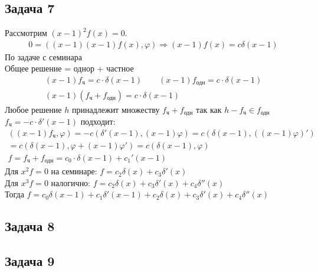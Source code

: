 \subsection*{Задача 7}
	Рассмотрим $(x-1)^2 f(x) = 0$.
	\begin{gather*}
		0 = ((x-1)(x-1)f(x), \varphi) \Rightarrow (x-1)f(x) = c \delta(x-1)
	\end{gather*}
	По задаче с семинара\\
	Общее решение = однор + частное
	\begin{gather*}
		(x-1)f_{\text{ч}} = c\cdot \delta(x-1)\qquad
		(x-1)f_{\text{одн}} = c \cdot \delta(x-1)\\
		(x-1)(f_{\text{ч}} + f_{\text{одн}}) = c \cdot \delta(x-1)
	\end{gather*}
	Любое решение $h$ принадлежит множеству $f_{\text{ч}} + f_{\text{одн}}$ так как $h - f_{\text{ч}} \in f_{\text{одн}}$\\
	$f_{\text{ч}} = -c \cdot \delta'(x-1)$ подходит:
	\begin{gather*}
		((x-1)f_{\text{ч}}, \varphi)
		= -c (\delta'(x-1), (x-1)\varphi)
		= c(\delta(x-1), ((x-1)\varphi)')\\
		= c(\delta(x-1), \varphi + (x-1) \varphi')
		= c(\delta(x-1), \varphi)\\
		f = f_{\text{ч}} + f_{\text{одн}} = c_{0} \cdot \delta(x-1) + c_{1}' (x-1)
	\end{gather*}
	Для $x^2 f = 0$ на семинаре: $f = c_{2} \delta(x) + c_{3} \delta'(x)$\\
	Для $x^3 f = 0$ налогично: $f = c_{2} \delta(x) + c_{3} \delta'(x) + c_{4} \delta''(x)$\\
	Тогда $f = c_{0} \delta(x-1) + c_{1} \delta'(x-1) + c_{2} \delta(x) + c_{3} \delta'(x) + c_{4} \delta''(x)$
\begin{comment}
	\begin{gather*}
		(f, x^2 \varphi) = (x^2f, \varphi) = 0\quad \forall \varphi \in \mathcal{D}(\mathbb{R})\\
		\{x^2 \varphi|\ \varphi \in \mathcal{D}\}
		= \{\varphi \in \mathcal{D}|\ \varphi(0) = \varphi'(0) = 0\}\\
		\varphi(0) = 0 \Rightarrow \psi = \frac{\varphi}{x} \in \mathcal{D}\\
		\psi(0) = \varphi'(0) = \frac{\varphi(x) - \varphi(0)}{x - 0}\\
		\varphi'(0) = 0\\
		\psi(0) = \varphi'(0) = 0 \Rightarrow \frac{\psi}{x} = \frac{\varphi}{x^2} \in \athcal{D}\\
		(f, \psi) = 0\quad \forall \psi:\ \psi(0) = \psi'(0) = 0
	\end{gather*} 
\end{comment}
\vskip 0.4in

\subsection*{Задача 8}
\vskip 0.4in

\subsection*{Задача 9}
